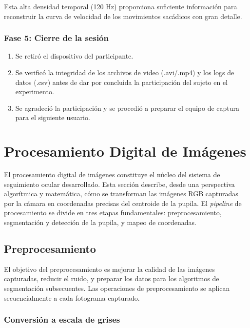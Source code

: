 Esta alta densidad temporal (120 Hz) proporciona suficiente información para reconstruir la curva de velocidad de los movimientos sacádicos con gran detalle.

\subsubsection{Fase 5: Cierre de la sesión}

\begin{enumerate}
	\item Se retiró el dispositivo del participante.
	\item Se verificó la integridad de los archivos de video (.avi/.mp4) y los logs de datos (.csv) antes de dar por concluida la participación del sujeto en el experimento.
	\item Se agradeció la participación y se procedió a preparar el equipo de captura para el siguiente usuario.
\end{enumerate}

\section{Procesamiento Digital de Imágenes}
\label{sec:procesamiento_imagenes}

El procesamiento digital de imágenes constituye el núcleo del sistema de seguimiento ocular desarrollado.
Esta sección describe, desde una perspectiva algorítmica y matemática, cómo se transforman las imágenes RGB capturadas por la cámara en coordenadas precisas del centroide de la pupila.
El \textit{pipeline} de procesamiento se divide en tres etapas fundamentales: preprocesamiento, segmentación y detección de la pupila, y mapeo de coordenadas.

\subsection{Preprocesamiento}

El objetivo del preprocesamiento es mejorar la calidad de las imágenes capturadas, reducir el ruido, y preparar los datos para los algoritmos de segmentación subsecuentes.
Las operaciones de preprocesamiento se aplican secuencialmente a cada fotograma capturado.

\subsubsection{Conversión a escala de grises}


